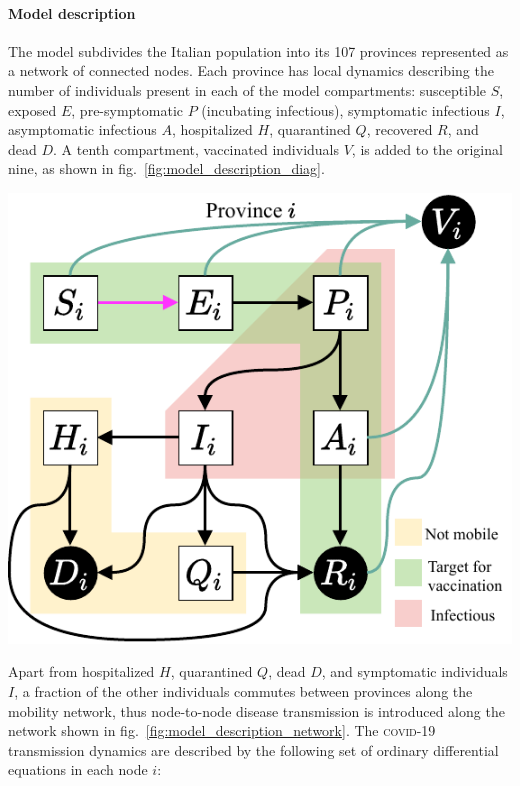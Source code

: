 \paragraph{Model description}
The model subdivides the Italian population into its 107 provinces represented as a network of connected nodes. Each province has local dynamics describing the number of individuals present in each of the model compartments: susceptible $S$, exposed $E$, pre-symptomatic $P$ (incubating infectious), symptomatic infectious $I$, asymptomatic infectious $A$, hospitalized $H$, quarantined $Q$, recovered $R$, and dead $D$. A tenth compartment, vaccinated individuals $V$, is added to the original nine, as shown in fig.~\ref{fig:model_description_diag}.
\begin{marginfigure}
\centering
\includegraphics{fig_italy-ocp/figures/OCPItalydrawio2.pdf}
    \label{fig:model_description_diag}
\end{marginfigure}
Apart from hospitalized $H$, quarantined $Q$, dead $D$, and symptomatic individuals $I$, a fraction of the other individuals commutes between provinces along the mobility network, thus node-to-node disease transmission is introduced along the network shown in fig.~\ref{fig:model_description_network}. The \textsc{covid}-19 transmission dynamics are described by the following set of ordinary differential equations in each node $i$: 
